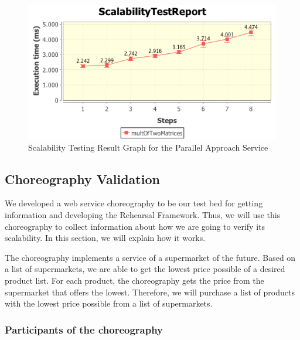 \begin{figure}[htbp]
\begin{center}
	\includegraphics[scale=0.8]{images/multiplicationOfTwoMatricesReport8}
\caption{Scalability Testing Result Graph for the Parallel Approach Service}
\label{dmmParallelGraph}
\end{center}
\end{figure}



\subsection{Choreography Validation}
We developed a web service choreography to be our test bed for getting information and developing the Rehearsal Framework. Thus, we will use this choreography to collect information about how we are going to verify its scalability. In this section, we will explain how it works.

The choreography implements a service of a supermarket of the future. Based on a list of supermarkets, we are able to get the lowest price possible of a desired product list. For each product, the choreography gets the price from the supermarket that offers the lowest. Therefore, we will purchase a list of products with the lowest price possible from a list of supermarkets.

\subsubsection{Participants of the choreography}
\label{participantschoreography}

